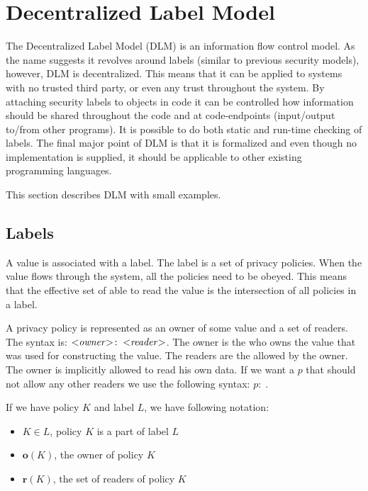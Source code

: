 
\newcommand{\policy}[2]{\ensuremath{#1\!:\;#2}}

\section{Decentralized Label Model}
The Decentralized Label Model (DLM) is an information flow control model.\cite{myers1999mostly}
As the name suggests it revolves around labels (similar to previous security models), however, DLM is decentralized.
This means that it can be applied to systems with no trusted third party, or even any trust throughout the system.
By attaching security labels to objects in code it can be controlled how information should be shared throughout the code and at code-endpoints (input/output to/from other programs).
It is possible to do both static and run-time checking of labels.
The final major point of DLM is that it is formalized and even though no implementation is supplied, it should be applicable to other existing programming languages.

\newcommand{\xvalue}{value}
\newcommand{\xvalues}{values}
This section describes DLM with small examples.

\subsection{Labels}
A \xvalue{} is associated with a label.
The label is a set of privacy policies.
When the \xvalue{} flows through the system, all the policies need to be obeyed.
This means that the effective set of \principals{} able to read the \xvalue{} is the intersection of all policies in a label.

A privacy policy is represented as an owner of some \xvalue{} and a set of readers.
The syntax is: $\policy{\text{<\emph{owner}>}}{\text{<\emph{reader}>}}$.
The owner is the \principal{} who owns the \xvalue{} that was used for constructing the \xvalue{}.
The readers are the \principals{} allowed by the owner.
The owner is implicitly allowed to read his own data.
If we want a \principal{} $p$ that should not allow any other readers we use the following syntax: $\policy{p}{}$.

If we have policy $K$ and label $L$, we have following notation:
\begin{itemize}
\item $K \in L$, policy $K$ is a part of label $L$
\item $\textbf{o}(K)$, the owner of policy $K$
\item $\textbf{r}(K)$, the set of readers of policy $K$
\end{itemize}

